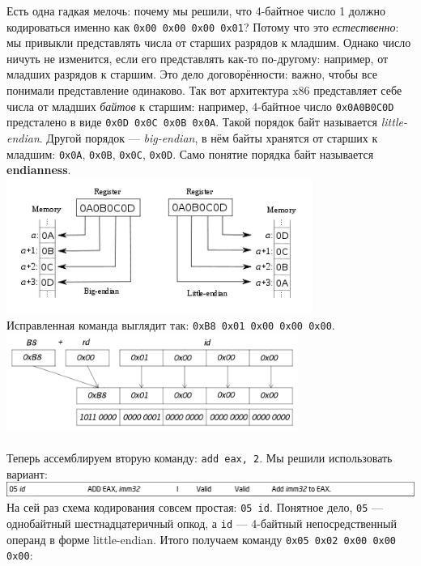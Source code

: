 \documentclass[11pt]{book}
\begin{document}
Есть одна гадкая мелочь: почему мы решили, что 4-байтное число 1 должно кодироваться именно как \texttt{0x00 0x00 0x00 0x01}?
Потому что это \emph{естественно}: мы привыкли представлять числа от старших разрядов к младшим.
Однако число ничуть не изменится, если его представлять как-то по-другому: например, от младших разрядов к старшим.
Это дело договорённости: важно, чтобы все понимали представление одинаково.
Так вот архитектура x86 представляет себе числа от младших \emph{байтов} к старшим:
например, 4-байтное число \texttt{0x0A0B0C0D} предсталено в виде \texttt{0x0D 0x0C 0x0B 0x0A}.
Такой порядок байт называется \emph{little-endian}.
Другой порядок --- \emph{big-endian}, в нём байты хранятся от старших к младшим: \texttt{0x0A}, \texttt{0x0B}, \texttt{0x0C}, \texttt{0x0D}.
Само понятие порядка байт называется \textbf{endianness}.
\\
\includegraphics[height=1.75in]{pic/22.png}
\\
Исправленная команда выглядит так: \texttt{0xB8 0x01 0x00 0x00 0x00}.
\\
\includegraphics[height=1.25in]{pic/mov_eax_1.png}
\\ \\
Теперь ассемблируем вторую команду: \texttt{add eax, 2}.
Мы решили использовать вариант:
\\
\includegraphics[width=6.5in]{pic/add_eax_imm32.png}
\\
На сей раз схема кодирования совсем простая: \texttt{05 id}.
Понятное дело, \texttt{05} --- однобайтный шестнадцатеричный опкод,
а \texttt{id} --- 4-байтный непосредственный операнд в форме little-endian.
Итого получаем команду \texttt{0x05 0x02 0x00 0x00 0x00}:
\end{document}
